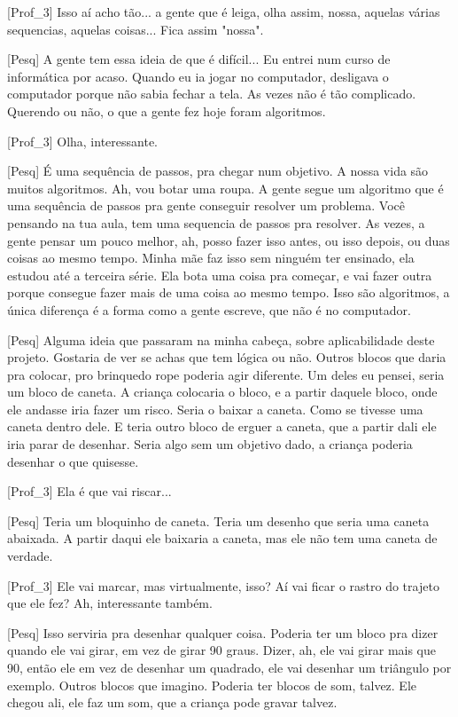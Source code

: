 [Prof\_3] Isso aí acho tão... a gente que é leiga, olha assim, nossa, aquelas várias sequencias, aquelas coisas... Fica assim "nossa".

[Pesq] A gente tem essa ideia de que é difícil... Eu entrei num curso de informática por acaso. Quando eu ia jogar no computador, desligava o computador porque não sabia fechar a tela. As vezes não é tão complicado. Querendo ou não, o que a gente fez hoje foram algoritmos.

[Prof\_3] Olha, interessante.

[Pesq] É uma sequência de passos, pra chegar num objetivo. A nossa vida são muitos algoritmos. Ah, vou botar uma roupa. A gente segue um algoritmo que é uma sequência de passos pra gente conseguir resolver um problema. Você pensando na tua aula, tem uma sequencia de passos pra resolver. As vezes, a gente pensar um pouco melhor, ah, posso fazer isso antes, ou isso depois, ou duas coisas ao mesmo tempo. Minha mãe faz isso sem ninguém ter ensinado, ela estudou até a terceira série. Ela bota uma coisa pra começar, e vai fazer outra porque consegue fazer mais de uma coisa ao mesmo tempo. Isso são algoritmos, a única diferença é a forma como a gente escreve, que não é no computador.

[Pesq] Alguma ideia que passaram na minha cabeça, sobre aplicabilidade deste projeto. Gostaria de ver se achas que tem lógica ou não. Outros blocos que daria pra colocar, pro brinquedo rope poderia agir diferente. Um deles eu pensei, seria um bloco de caneta. A criança colocaria o bloco, e a partir daquele bloco, onde ele andasse iria fazer um risco. Seria o baixar a caneta. Como se tivesse uma caneta dentro dele. E teria outro bloco de erguer a caneta, que a partir dali ele iria parar de desenhar. Seria algo sem um objetivo dado, a criança poderia desenhar o que quisesse. 

[Prof\_3] Ela é que vai riscar...

[Pesq] Teria um bloquinho de caneta. Teria um desenho que seria uma caneta abaixada. A partir daqui ele baixaria a caneta, mas ele não tem uma caneta de verdade. 

[Prof\_3] Ele vai marcar, mas virtualmente, isso? Aí vai ficar o rastro do trajeto que ele fez? Ah, interessante também. 

[Pesq] Isso serviria pra desenhar qualquer coisa. Poderia ter um bloco pra dizer quando ele vai girar, em vez de girar 90 graus. Dizer, ah, ele vai girar mais que 90, então ele em vez de desenhar um quadrado, ele vai desenhar um triângulo por exemplo. Outros blocos que imagino. Poderia ter blocos de som, talvez. Ele chegou ali, ele faz um som, que a criança pode gravar talvez.

